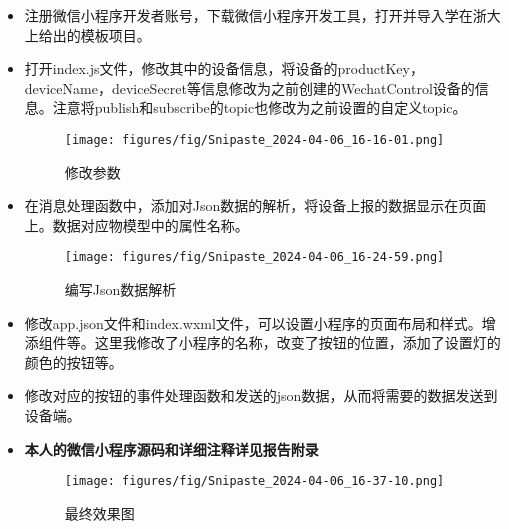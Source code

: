 \documentclass[12pt,hyperref,a4paper,UTF8]{ctexart}
\begin{document}
\begin{itemize}
  \item 注册微信小程序开发者账号，下载微信小程序开发工具，打开并导入学在浙大上给出的模板项目。
  \item 打开index.js文件，修改其中的设备信息，将设备的productKey，deviceName，deviceSecret等信息修改为之前创建的WechatControl设备的信息。注意将publish和subscribe的topic也修改为之前设置的自定义topic。
  \begin{figure}[H]
    \centering
    \texttt{[image: figures/fig/Snipaste\_2024-04-06\_16-16-01.png]}
    \caption{修改参数}
    \label{fig:enter-label}
  \end{figure}
  \item 在消息处理函数中，添加对Json数据的解析，将设备上报的数据显示在页面上。数据对应物模型中的属性名称。
  \begin{figure}[H]
    \centering
    \texttt{[image: figures/fig/Snipaste\_2024-04-06\_16-24-59.png]}
    \caption{编写Json数据解析}
    \label{fig:enter-label}
  \end{figure}

  \item 修改app.json文件和index.wxml文件，可以设置小程序的页面布局和样式。增添组件等。这里我修改了小程序的名称，改变了按钮的位置，添加了设置灯的颜色的按钮等。
  \item 修改对应的按钮的事件处理函数和发送的json数据，从而将需要的数据发送到设备端。
  \item \textbf{本人的微信小程序源码和详细注释详见报告附录}
  \begin{figure}[H]
    \centering
    \texttt{[image: figures/fig/Snipaste\_2024-04-06\_16-37-10.png]}
    \caption{最终效果图}
    \label{fig:enter-label}
  \end{figure}






\end{itemize}
\end{document}
